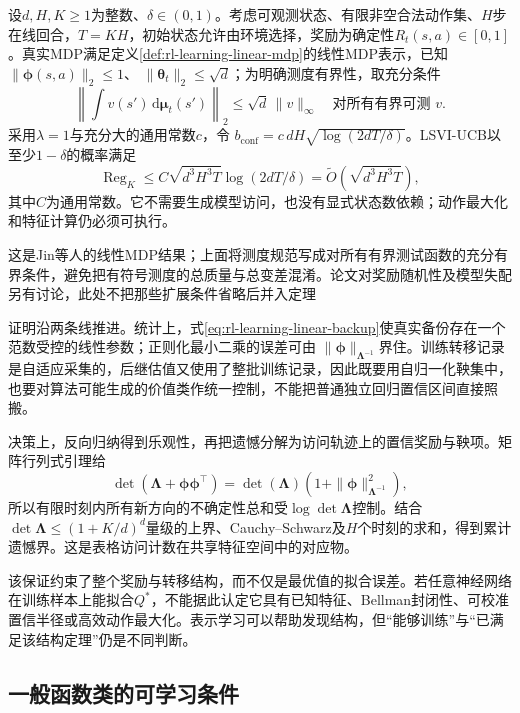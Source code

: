 \begin{theorem}
  \label{thm:rl-learning-lsvi}
  设$d,H,K\geq1$为整数、$\delta\in(0,1)$。考虑可观测状态、有限非空合法动作集、$H$步在线回合，$T=KH$，初始状态允许由环境选择，奖励为确定性$R_t(s,a)\in[0,1]$。真实MDP满足定义\ref{def:rl-learning-linear-mdp}的线性MDP表示，已知
  $\|\bm\phi(s,a)\|_2\leq1$、
  $\|\bm\theta_t\|_2\leq\sqrt d$；为明确测度有界性，取充分条件
  \[
    \left\|\int v(s')\,\mathrm d\bm\mu_t(s')\right\|_2
                          \leq\sqrt d\,\|v\|_\infty
        \quad\text{对所有有界可测 }v.
  \]
  采用$\lambda=1$与充分大的通用常数$c$，令
  $b_{\mathrm{conf}}=c\,dH\sqrt{\log(2dT/\delta)}$。LSVI-UCB以至少$1-\delta$的概率满足
  \[
    \operatorname{Reg}_K
       \leq C\sqrt{d^3H^3T}\log(2dT/\delta)
       =\widetilde O(\sqrt{d^3H^3T}),
  \]
  其中$C$为通用常数。它不需要生成模型访问，也没有显式状态数依赖；动作最大化和特征计算仍必须可执行。
\end{theorem}

这是Jin等人的线性MDP结果；上面将测度规范写成对所有有界测试函数的充分有界条件，避免把有符号测度的总质量与总变差混淆。论文对奖励随机性及模型失配另有讨论，此处不把那些扩展条件省略后并入定理

证明沿两条线推进。统计上，式\eqref{eq:rl-learning-linear-backup}使真实备份存在一个范数受控的线性参数；正则化最小二乘的误差可由
$\|\bm\phi\|_{\bm\Lambda^{-1}}$界住。训练转移记录是自适应采集的，后继估值又使用了整批训练记录，因此既要用自归一化鞅集中，也要对算法可能生成的价值类作统一控制，不能把普通独立回归置信区间直接照搬。

决策上，反向归纳得到乐观性，再把遗憾分解为访问轨迹上的置信奖励与鞅项。矩阵行列式引理给
\[
 \det(\bm\Lambda+\bm\phi\bm\phi^\top)
    =\det(\bm\Lambda)(1+\|\bm\phi\|_{\bm\Lambda^{-1}}^2),
\]
所以有限时刻内所有新方向的不确定性总和受$\log\det\bm\Lambda$控制。结合
$\det\bm\Lambda\leq(1+K/d)^d$量级的上界、Cauchy--Schwarz及$H$个时刻的求和，得到累计遗憾界。这是表格访问计数在共享特征空间中的对应物。

该保证约束了整个奖励与转移结构，而不仅是最优值的拟合误差。若任意神经网络在训练样本上能拟合$Q^*$，不能据此认定它具有已知特征、Bellman封闭性、可校准置信半径或高效动作最大化。表示学习可以帮助发现结构，但“能够训练”与“已满足该结构定理”仍是不同判断。

\subsection{一般函数类的可学习条件}
\label{sec:rl-learning-function-classes}

